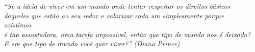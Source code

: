 \begin{epigrafe}
    \vspace*{\fill}
	\begin{flushright}
		\textit{``Se a ideia de viver em um mundo onde tentar respeitar os direitos básicos \\daqueles que estão ao seu redor e valorizar cada um simplesmente porque existimos \\é tão assustadora, uma tarefa impossível, então que tipo de mundo nos é deixado?\\ E em que tipo de mundo você quer viver?'' (Diana Prince)}
	\end{flushright}
\end{epigrafe}
